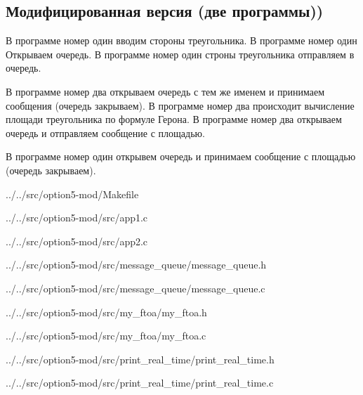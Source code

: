 \subsection*{Модифицированная версия (две программы))}

В программе номер один вводим стороны треугольника. В программе номер один Открываем очередь. В программе номер один строны треугольника отправляем в очередь.

В программе номер два открываем очередь с тем же именем и принимаем сообщения (очередь закрываем). В программе номер два происходит вычисление площади треугольника по формуле Герона. В программе номер два открываем очередь и отправляем сообщение с площадью.

В программе номер один открывем очередь и принимаем сообщение с площадью (очередь закрываем).

\newpage


{../../src/option5-mod/Makefile}


{../../src/option5-mod/src/app1.c}


{../../src/option5-mod/src/app2.c}


{../../src/option5-mod/src/message_queue/message_queue.h}


{../../src/option5-mod/src/message_queue/message_queue.c}


{../../src/option5-mod/src/my_ftoa/my_ftoa.h}


{../../src/option5-mod/src/my_ftoa/my_ftoa.c}


{../../src/option5-mod/src/print_real_time/print_real_time.h}


{../../src/option5-mod/src/print_real_time/print_real_time.c}

